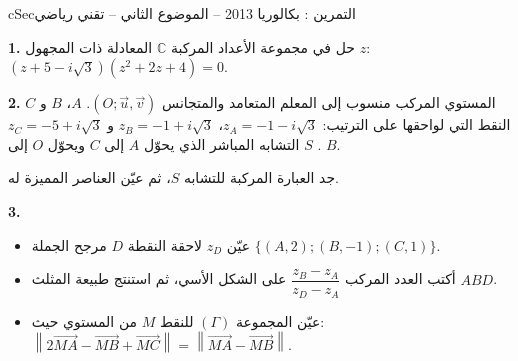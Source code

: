 \documentclass[12pt,a4paper]{article}
\newenvironment{BOX}[2]{\begin{otherlanguage}{english}\begin{arbox}{#1}{#2}}{\end{arbox}\end{otherlanguage}}
\newcounter{exo}
\newenvironment{tamrin}[1]{\stepcounter{exo}\begin{BOX}{cSec}{التمرين \theexo: #1}}{\end{BOX}}
\newenvironment{sq}{\begin{itemize}[leftmargin=2.4em,itemsep=3pt]}{\end{itemize}}
\newcommand{\qa}{\item[(أ)]}\newcommand{\qb}{\item[(ب)]}\newcommand{\qc}{\item[(جـ)]}\newcommand{\qd}{\item[(د)]}\newcommand{\qe}{\item[(هـ)]}
\newcommand{\QQ}[1]{\par\smallskip\textbf{#1.} }
\begin{document}
\begin{tamrin}{بكالوريا 2013 -- الموضوع الثاني -- تقني رياضي}
\QQ{1} حل في مجموعة الأعداد المركبة $\mathbb{C}$ المعادلة ذات المجهول $z$: $(z+5-i\sqrt3)(z^2+2z+4)=0$.
\QQ{2} المستوي المركب منسوب إلى المعلم المتعامد والمتجانس $(O;\vec u,\vec v)$.
$A$، $B$ و $C$ النقط التي لواحقها على الترتيب: $z_A=-1-i\sqrt3$، $z_B=-1+i\sqrt3$ و $z_C=-5+i\sqrt3$.
$S$ التشابه المباشر الذي يحوّل $A$ إلى $C$ ويحوّل $O$ إلى $B$.

جد العبارة المركبة للتشابه $S$، ثم عيّن العناصر المميزة له.
\QQ{3}
\begin{sq}
\qa عيّن $z_D$ لاحقة النقطة $D$ مرجح الجملة $\{(A,2);(B,-1);(C,1)\}$.
\qb أكتب العدد المركب $\dfrac{z_B-z_A}{z_D-z_A}$ على الشكل الأسي، ثم استنتج طبيعة المثلث $ABD$.
\qc عيّن المجموعة $(\Gamma)$ للنقط $M$ من المستوي حيث: $\left\|2\overrightarrow{MA}-\overrightarrow{MB}+\overrightarrow{MC}\right\|=\left\|\overrightarrow{MA}-\overrightarrow{MB}\right\|$.
\end{sq}
\end{tamrin}
\end{document}
